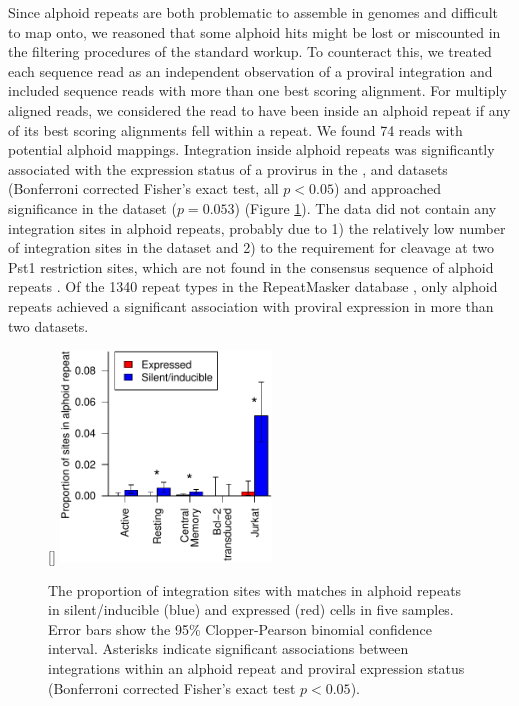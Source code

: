 \documentclass[../sherrill-Mix_thesis.tex]{subfiles}
\begin{document}
		Since alphoid repeats are both problematic to assemble in genomes and difficult to map onto, we reasoned that some alphoid hits might be lost or miscounted in the filtering procedures of the standard workup. To counteract this, we treated each sequence read as an independent observation of a proviral integration and included sequence reads with more than one best scoring alignment. For multiply aligned reads, we considered the read to have been inside an alphoid repeat if any of its best scoring alignments fell within a repeat.  We found 74 reads with potential alphoid mappings.  Integration inside alphoid repeats was significantly associated with the expression status of a provirus in the \Resting{}, \Jurkat{} and \Memory{} datasets (Bonferroni corrected Fisher's exact test, all $p < 0.05$) and approached significance in the \Active{} dataset ($p=0.053$) (Figure \ref{figAlphoid}). The \Bcl{} data did not contain any integration sites in alphoid repeats, probably due to 1) the relatively low number of integration sites in the dataset and 2) to the requirement for cleavage at two Pst1 restriction sites, which are not found in the consensus sequence of alphoid repeats \citep{Jurka2005}. Of the 1340 repeat types in the RepeatMasker database \citep{Jurka2005}, only alphoid repeats achieved a significant association with proviral expression in more than two datasets.

	\begin{figure}
		\centering
			[\FBwidth]{
				\includegraphics[width=0.5\textwidth]{alphoidBar.pdf} %
			}{
				\caption[Alphoid repeats and latency]{The proportion of integration sites with matches in alphoid repeats in silent/inducible (blue) and expressed (red) cells in five samples. Error bars show the 95\% Clopper-Pearson binomial confidence interval. Asterisks indicate significant associations between integrations within an alphoid repeat and proviral expression status (Bonferroni corrected Fisher's exact test $p<0.05$).}
				\label{figAlphoid}
			}
	\end{figure}
\end{document}
